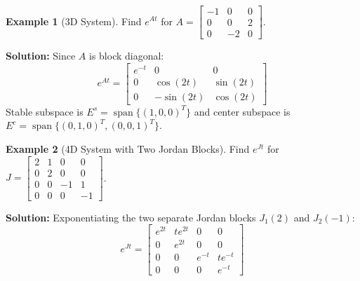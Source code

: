 \documentclass[12pt,a4paper,oneside]{article}
\theoremstyle{definition}
\newtheorem{example}{Example}[section]
\theoremstyle{plain}
\begin{document}
\begin{example}[3D System]
Find $e^{At}$ for $A = \begin{bmatrix} -1 & 0 & 0 \\ 0 & 0 & 2 \\ 0 & -2 & 0 \end{bmatrix}$.

\textbf{Solution:}
Since $A$ is block diagonal:
\begin{equation}
    e^{At} = \begin{bmatrix} e^{-t} & 0 & 0 \\ 0 & \cos(2t) & \sin(2t) \\ 0 & -\sin(2t) & \cos(2t) \end{bmatrix}
\end{equation}
Stable subspace is $E^s = \operatorname{span}\{(1,0,0)^T\}$ and center subspace is $E^c = \operatorname{span}\{(0,1,0)^T, (0,0,1)^T\}$.
\end{example}

\begin{example}[4D System with Two Jordan Blocks]
Find $e^{Jt}$ for $J = \begin{bmatrix} 2 & 1 & 0 & 0 \\ 0 & 2 & 0 & 0 \\ 0 & 0 & -1 & 1 \\ 0 & 0 & 0 & -1 \end{bmatrix}$.

\textbf{Solution:}
Exponentiating the two separate Jordan blocks $J_1(2)$ and $J_2(-1)$:
\begin{equation}
    e^{Jt} = \begin{bmatrix} e^{2t} & t e^{2t} & 0 & 0 \\ 0 & e^{2t} & 0 & 0 \\ 0 & 0 & e^{-t} & t e^{-t} \\ 0 & 0 & 0 & e^{-t} \end{bmatrix}
\end{equation}
\end{example}
\end{document}
